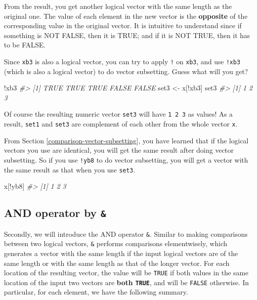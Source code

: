 \documentclass[
]{book}
\newenvironment{Shaded}{\begin{snugshade}}{\end{snugshade}}
\newcommand{\CommentTok}[1]{\textcolor[rgb]{0.56,0.35,0.01}{\textit{#1}}}
\newcommand{\NormalTok}[1]{#1}
\newcommand{\OtherTok}[1]{\textcolor[rgb]{0.56,0.35,0.01}{#1}}
\newcommand{\SpecialCharTok}[1]{\textcolor[rgb]{0.00,0.00,0.00}{#1}}
\begin{document}
From the result, you get another logical vector with the same length as the original one. The value of each element in the new vector is the \textbf{opposite} of the corresponding value in the original vector. It is intuitive to understand since if something is NOT FALSE, then it is TRUE; and if it is NOT TRUE, then it has to be FALSE.

Since \texttt{xb3} is also a logical vector, you can try to apply \texttt{!} on \texttt{xb3}, and use \texttt{!xb3} (which is also a logical vector) to do vector subsetting. Guess what will you get?

\begin{Shaded}
\begin{Highlighting}[]
\SpecialCharTok{!}\NormalTok{xb3}
\CommentTok{\#\textgreater{} [1]  TRUE  TRUE  TRUE FALSE FALSE}
\NormalTok{set3 }\OtherTok{\textless{}{-}}\NormalTok{ x[}\SpecialCharTok{!}\NormalTok{xb3]}
\NormalTok{set3}
\CommentTok{\#\textgreater{} [1] 1 2 3}
\end{Highlighting}
\end{Shaded}

Of course the resulting numeric vector \texttt{set3} will have \texttt{1\ 2\ 3} as values! As a result, \texttt{set1} and \texttt{set3} are complement of each other from the whole vector \texttt{x}.

From Section \ref{comparison-vector-subsetting}, you have learned that if the logical vectors you use are identical, you will get the same result after doing vector subsetting. So if you use \texttt{!yb8} to do vector subsetting, you will get a vector with the same result as that when you use \texttt{set3}.

\begin{Shaded}
\begin{Highlighting}[]
\NormalTok{x[}\SpecialCharTok{!}\NormalTok{yb8]}
\CommentTok{\#\textgreater{} [1] 1 2 3}
\end{Highlighting}
\end{Shaded}

\hypertarget{and-operator-by}{%
\subsection{\texorpdfstring{AND operator by \texttt{\&}}{AND operator by \&}}\label{and-operator-by}}

Secondly, we will introduce the AND operator \texttt{\&}. Similar to making comparisons between two logical vectors, \texttt{\&} performs comparisons elementwisely, which generates a vector with the same length if the input logical vectors are of the same length or with the same length as that of the longer vector. For each location of the resulting vector, the value will be \texttt{TRUE} if both values in the same location of the input two vectors are \textbf{both \texttt{TRUE}}, and will be \texttt{FALSE} otherwise. In particular, for each element, we have the following summary.
\end{document}
